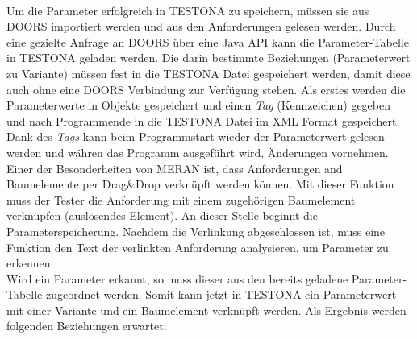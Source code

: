 \paragraph{}

 
Um die Parameter erfolgreich in TESTONA zu speichern, müssen sie aus DOORS importiert werden und aus den Anforderungen gelesen werden. Durch eine gezielte Anfrage an DOORS über eine Java API kann die Parameter-Tabelle in TESTONA geladen werden. Die darin bestimmte Beziehungen (Parameterwert zu Variante) müssen fest in die TESTONA Datei gespeichert werden, damit diese auch ohne eine DOORS Verbindung zur Verfügung stehen. Als erstes werden die Parameterwerte in Objekte gespeichert und einen \textit{Tag} (Kennzeichen) gegeben und nach Programmende in die TESTONA Datei im XML Format gespeichert. Dank des \textit{Tags} kann beim Programmstart wieder der Parameterwert gelesen werden und währen das Programm ausgeführt wird, Änderungen vornehmen.\\

Einer der Besonderheiten von MERAN ist, dass Anforderungen and Baumelemente per Drag\&Drop verknüpft werden können. Mit dieser Funktion muss der Tester die Anforderung mit einem zugehörigen Baumelement verknüpfen (auslösendes Element). An dieser Stelle beginnt die Parameterspeicherung. Nachdem die Verlinkung abgeschlossen ist, muss eine Funktion den Text der verlinkten Anforderung analysieren, um Parameter zu erkennen.\\

Wird ein Parameter erkannt, so muss dieser aus den bereits geladene Parameter-Tabelle zugeordnet werden. Somit kann jetzt in TESTONA ein Parameterwert mit einer Variante und ein Baumelement verknüpft werden. Als Ergebnis werden folgenden Beziehungen erwartet:

